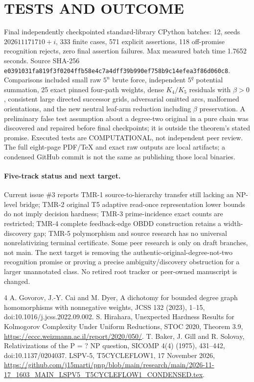 \documentclass[11pt]{article}
\begin{document}
\section{TESTS AND OUTCOME}
Final independently checkpointed standard-library CPython batches: 12, seeds $202611171710+i$, 333 finite cases, 571 explicit assertions, 118 off-promise recognition rejects, zero final assertion failures. Max measured batch time 1.7652 seconds. Source SHA-256
\texttt{e0391031fa819f3f0204ffb58e4c7a4dff39b990ef758b9c14efea3f86d060c8}.
Comparisons included small raw $5^n$ brute force, independent $5^q$ potential summation, 25 exact pinned four-path weights, dense $K_4/K_5$ residuals with $\beta>0$, consistent large directed successor grids, adversarial omitted arcs, malformed orientations, and the new neutral leaf-arm reduction including $\beta$ preservation. A preliminary false test assumption about a degree-two original in a pure chain was discovered and repaired before final checkpoints; it is outside the theorem's stated promise. Executed tests are COMPUTATIONAL, not independent peer review. The full eight-page PDF/TeX and exact raw outputs are local artifacts; a condensed GitHub commit is not the same as publishing those local binaries.

\paragraph{Five-track status and next target.} Current issue \#3 reports TMR-1 source-to-hierarchy transfer still lacking an NP-level bridge; TMR-2 original T5 adaptive read-once representation lower bounds do not imply decision hardness; TMR-3 prime-incidence exact counts are restricted; TMR-4 complete feedback-edge OBDD construction retains a width-discovery gap; TMR-5 polymorphism and source research has no universal nonrelativizing terminal certificate. Some peer research is only on draft branches, not main. The next target is removing the authentic-original-degree-not-two recognition promise or proving a precise ambiguity/discovery obstruction for a larger unannotated class. No retired root tracker or peer-owned manuscript is changed.

\begin{thebibliography}{4}
 A. Govorov, J.-Y. Cai and M. Dyer, A dichotomy for bounded degree graph homomorphisms with nonnegative weights, JCSS 132 (2023), 1--15, doi:10.1016/j.jcss.2022.09.002.
 S. Hirahara, Unexpected Hardness Results for Kolmogorov Complexity Under Uniform Reductions, STOC 2020, Theorem 3.9, \url{https://eccc.weizmann.ac.il/report/2020/050/}.
 T. Baker, J. Gill and R. Solovay, Relativizations of the P = ? NP question, SICOMP 4(4) (1975), 431--442, doi:10.1137/0204037.
 LSPV-5, T5CYCLEFLOW1, 17 November 2026, \url{https://github.com/j15marti/pnp/blob/main/research/main/2026-11-17_1603_MAIN_LSPV5_T5CYCLEFLOW1_CONDENSED.tex}.
\end{thebibliography}
\end{document}
